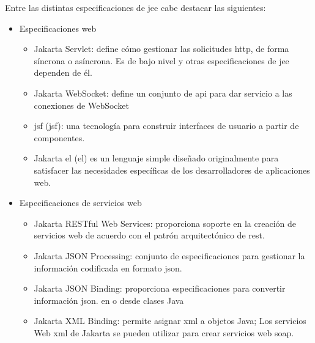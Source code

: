 Entre las distintas especificaciones de \acrshort{jee} cabe destacar las siguientes:
\begin{itemize}
   \item Especificaciones web
     \begin{itemize}
       \item Jakarta Servlet: define cómo gestionar las solicitudes \acrfull{http}, de forma síncrona o asíncrona. Es de bajo nivel y otras especificaciones de \acrshort{jee} dependen de él.
	   \item Jakarta WebSocket: define un conjunto de \acrshort{api} para dar servicio a las conexiones de WebSocket
   	   \item \acrshort{jsf} (\acrlong{jsf}): una tecnología para construir interfaces de usuario a partir de componentes.
  	   \item Jakarta \acrshort{el} (\acrlong{el}) es un lenguaje simple diseñado originalmente para satisfacer las necesidades específicas de los desarrolladores de aplicaciones web.
     \end{itemize} 
   \item Especificaciones de servicios web
     \begin{itemize}
       \item Jakarta RESTful Web Services: proporciona soporte en la creación de servicios web de acuerdo con el patrón arquitectónico de \acrfull{rest}.
  	   \item Jakarta JSON Processing: conjunto de especificaciones para gestionar la información codificada en formato \acrfull{json}.
	   \item Jakarta JSON Binding: proporciona especificaciones para convertir información \acrshort{json}. en o desde clases Java
 	   \item Jakarta XML Binding: permite asignar \acrfull{xml} a objetos Java; Los servicios Web \acrshort{xml} de Jakarta se pueden utilizar para crear servicios web \acrfull{soap}.
     \end{itemize}
     

\end{itemize}
